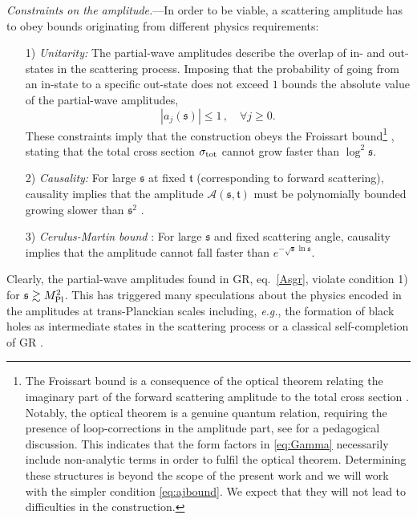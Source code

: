 \documentclass[aps,prl,reprint,twocolumn,superscriptaddress,longbibliography,nofootinbib,floatfix,showpacs]{revtex4-1}
\newcommand{\cA}{{\mathcal A}}
\newcommand{\GR}{{\small GR}}
\newcommand{\eg}{{\textit{e.g.}}}
\newcommand{\be}{\begin{equation}}
\newcommand{\ee}{\end{equation}}
\newcommand{\mans}{\ensuremath{\mathfrak{s}}}
\newcommand{\mant}{\ensuremath{\mathfrak{t}}}
\begin{document}
\textit{Constraints on the amplitude.}---In order to be viable,  a scattering amplitude has to obey bounds originating from different physics requirements:
\begin{enumerate}
	\item[1)] \emph{Unitarity:}
		The partial-wave amplitudes describe the overlap of in- and out-states in the scattering process.
		Imposing that the probability of going from an in-state to a specific out-state does not exceed $1$ bounds the absolute value of the partial-wave amplitudes,
	\be\label{eq:ajbound}
 \left| a_j(\mans) \right| \le 1 \, , \quad \forall j \ge 0 . 
	\ee
		These constraints imply that the construction obeys the Froissart bound\footnote{The Froissart bound is a consequence of the optical theorem relating the imaginary part of the forward scattering amplitude to the total cross section \cite{Froissart:2010}. Notably, the optical theorem is a genuine quantum relation, requiring the presence of loop-corrections in the amplitude part, see \cite{Anselmi:2019xac} for a pedagogical discussion. This indicates that the form factors in \eqref{eq:Gamma} necessarily include non-analytic terms in order to fulfil the optical theorem. Determining these structures is beyond the scope of the present work and we will work with the simpler condition \eqref{eq:ajbound}. We expect that they will not lead to difficulties in the construction.}  \cite{Froissart:1961ux, Froissart:2010}, stating that the total cross section $\sigma_{\rm tot}$ cannot grow faster than $\log^2 \mans$. 
%

	\item[2)] \emph{Causality:}
		For large $\mans$ at fixed $\mant$ (corresponding to forward scattering), causality implies that the amplitude $\cA(\mans,\mant)$ must be polynomially bounded growing slower than $\mans^2$ \cite{Camanho:2014apa}.
%

	\item[3)] \emph{Cerulus-Martin bound} \cite{Cerulus:1964cjb,Epstein:2019zdn}:
	For large $\mans$ and fixed scattering angle, causality implies that the amplitude cannot fall faster than $e^{-\sqrt{\mans} \ln \mans}$.
\end{enumerate}
%
Clearly, the partial-wave amplitudes found in \GR{}, eq.\ \eqref{Asgr}, violate condition 1) for $\mans \gtrsim M_{\rm Pl}^2$.
This has triggered many speculations about the physics encoded in the amplitudes at trans-Planckian scales including, \eg{}, the formation of black holes as intermediate states in the scattering process \cite{Giddings:2009gj} or a classical self-completion of \GR{} \cite{Dvali:2010jz}.
\end{document}
